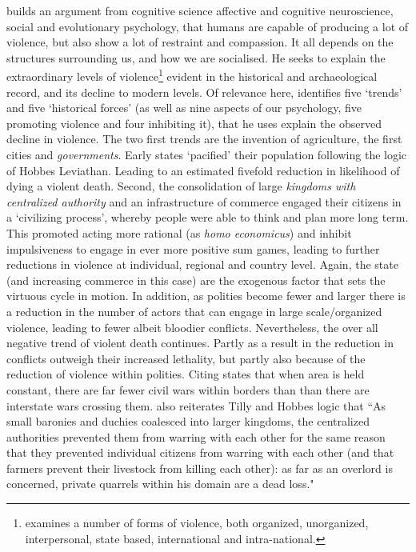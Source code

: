 \documentclass[12pt]{article}
\begin{document}
\citet{Pinker2012} builds an argument from cognitive science affective and
cognitive neuroscience, social and evolutionary  psychology, that humans are
capable of producing a lot of violence, but also show a lot of restraint and
compassion. It  all depends on the structures surrounding us, and how we are
socialised. He seeks to explain the extraordinary levels of
violence\footnote{\citet{Pinker2012} examines a number of forms of violence,
	both organized, unorganized, interpersonal, state based, international
and intra-national.} evident in the historical and archaeological record, and
its decline to modern levels.  Of relevance here, \citet{Pinker2012} identifies
five `trends' and five `historical forces' (as well as nine aspects of our
psychology, five promoting violence and four inhibiting it), that he uses
explain the observed decline in violence. The two first trends are the invention
of agriculture, the first cities and \textit{governments}. Early states
`pacified' their population following the logic of Hobbes Leviathan.  Leading to
an estimated fivefold reduction in likelihood of dying a violent death. Second,
the consolidation of large \textit{kingdoms with centralized authority} and an
infrastructure of commerce engaged their citizens in a `civilizing process',
whereby people were able to think and plan more long term.  This promoted acting
more rational (as \textit{homo economicus}) and inhibit impulsiveness to engage
in ever more positive sum games, leading to further reductions in violence at
individual, regional and country level. Again, the state (and increasing
commerce in this case) are the exogenous factor that sets the virtuous cycle in
motion. In addition, as polities become fewer and larger there is a reduction in
the number of actors that can engage in large scale/organized violence, leading
to fewer albeit bloodier conflicts. Nevertheless, the over all negative trend of
violent death continues. Partly as a result in the reduction in conflicts
outweigh their increased lethality, but partly also because of the reduction of
violence within polities. Citing \citet{richardson1960statistics}
\citet{Pinker2012} states that when area is held constant, there are far fewer
civil wars within borders than than there are interstate wars crossing them.
\citet{Pinker2012} also reiterates Tilly and Hobbes logic that ``As small
baronies and duchies coalesced into larger kingdoms, the centralized
authorities prevented them from warring with each other for the same reason that
they prevented individual citizens from warring with each other (and that
farmers prevent their livestock from killing each other): as far as an overlord
is concerned, private quarrels within his domain are a dead loss."
\end{document}
